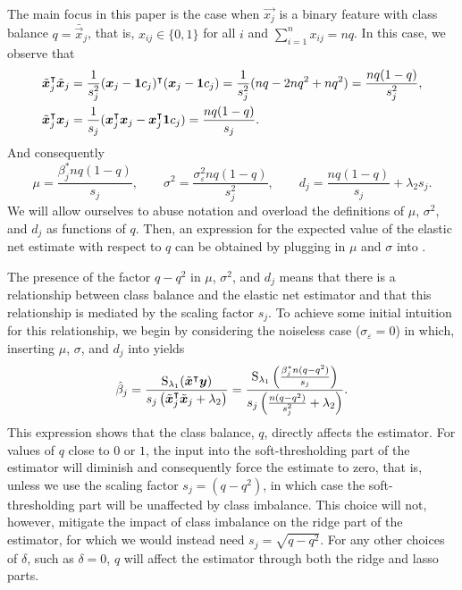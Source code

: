 The main focus in this paper is the case when \(\vec{x_j}\) is a binary feature with class balance \(q = \bar{\vec{x}}_j\), that is, \(x_{ij} \in \{0, 1\}\) for all \(i\) and \(\sum_{i=1}^n x_{ij} = nq\).
In this case, we observe that
\[
  \begin{aligned}
    \tilde{\boldsymbol{x}}_j^\intercal \tilde{\boldsymbol{x}}_j & = \frac{1}{s_j^2}(\boldsymbol{x}_j - \boldsymbol{1} c_j)^\intercal (\boldsymbol{x}_j - \boldsymbol{1} c_j) = \frac{1}{s^2_j}(nq - 2nq^2 + nq^2) = \frac{nq(1-q)}{s^2_j}, \\
    \tilde{\boldsymbol{x}}_j^\intercal \boldsymbol{x}_j         & = \frac{1}{s_j}(\boldsymbol{x}_j^\intercal \boldsymbol{x}_j - \boldsymbol{x}_j^\intercal \boldsymbol{1} c_j) = \frac{nq(1 - q)}{s_j}.
  \end{aligned}
\]
And consequently
\[
  \mu = \frac{\beta^*_j nq(1 - q)}{s_j}, \qquad \sigma^2 = \frac{\sigma_\varepsilon^2nq(1 - q)}{s^2_j}, \qquad d_j = \frac{nq(1 -q)}{s_j}  + \lambda_2 s_j.
\]
We will allow ourselves to abuse notation and overload the definitions of \(\mu\), \(\sigma^2\), and \(d_j\) as functions of \(q\). Then, an expression for the expected value of the elastic net estimate with respect to \(q\) can be obtained by plugging in \(\mu\) and \(\sigma\) into .

The presence of the factor \(q - q^2\) in \(\mu\), \(\sigma^2\), and \(d_j\) means that there is a relationship between class balance and the elastic net estimator and that this relationship is mediated by the scaling factor \(s_j\). To achieve some initial intuition for this relationship, we begin by considering the noiseless case (\(\sigma_\varepsilon = 0\)) in which, inserting  \(\mu\), \(\sigma\), and \(d_j\) into  yields
\[
  \hat{\beta}_j = \frac{\operatorname{S}_{\lambda_1}(\tilde{\boldsymbol{x}}^\intercal \boldsymbol{y})}{s_j\left(\tilde{\boldsymbol{x}}_j^\intercal \tilde{\boldsymbol{x}}_j + \lambda_2\right)}
  =
  \frac{\operatorname{S}_{\lambda_1}\left(\frac{\beta_j^* n (q - q^2)}{s_j}\right)}{s_j\left(\frac{n(q - q^2)}{s_j^2} + \lambda_2\right)}.
\]
This expression shows that the class balance, \(q\), directly affects the estimator. For values of \(q\) close to \(0\) or \(1\), the input into the soft-thresholding part of the estimator will diminish and consequently force the estimate to zero, that is, unless we use the scaling factor \(s_j = (q - q^2)\), in which case the soft-thresholding part will be unaffected by class imbalance. This choice will not, however, mitigate the impact of class imbalance on the ridge part of the estimator, for which we would instead need \(s_j = \sqrt{q - q^2}\). For any other choices of \(\delta\), such as \(\delta = 0\), \(q\) will affect the estimator through both the ridge and lasso parts.

